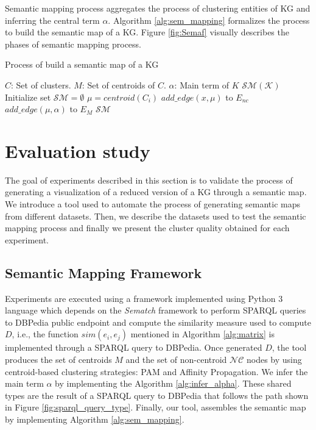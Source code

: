 \documentclass{ieeeaccess}
\begin{document}
Semantic mapping process aggregates the process of clustering
entities of KG and inferring the central term $\alpha$.
Algorithm \ref{alg:sem_mapping} formalizes the process to
build the semantic map of a KG.  Figure \ref{fig:Semaf} 
visually describes the phases of semantic mapping process.

\begin{algorithm}
\caption{Process of build a semantic map of a KG}
\label{alg:sem_mapping}
\begin{algorithmic}[1]
\renewcommand{\algorithmicrequire}{\textbf{Input:}}
\renewcommand{\algorithmicensure}{\textbf{Output:}}
\REQUIRE $C$: Set of clusters.
\REQUIRE $M$: Set of centroids of $C$.
\REQUIRE $\alpha$: Main term of $K$
\ENSURE $\mathcal{SM(K)}$
\STATE Initialize set $\mathcal{SM} = \emptyset$
    \STATE $\mu = centroid(C_{i})$
        \STATE $add\_edge(x, \mu)$ to $E_{nc}$
    \ENDFOR
\ENDFOR
{}
    \STATE $add\_edge(\mu, \alpha)$ to $E_{M}$
\ENDFOR
\RETURN $\mathcal{SM}$
\end{algorithmic} 
\end{algorithm}

\section{Evaluation study}
\label{sec:results}

The goal of experiments described in this section is to validate the 
process of generating a visualization of a reduced version of a KG 
through a semantic map. We introduce a tool used to automate the 
process of generating semantic maps from different datasets. Then, 
we describe the datasets used to test the semantic mapping process and 
finally we present the cluster quality obtained for each experiment.

\subsection{Semantic Mapping Framework}

Experiments are executed using a framework implemented using 
Python 3 language which depends on the \textit{Sematch} 
framework \cite{ZHU201730} to perform SPARQL queries to 
DBPedia public endpoint and compute the similarity measure
used to compute $D$, i.e., the function $sim(e_{i}, e_{j})$
mentioned in Algorithm \ref{alg:matrix} is implemented through
a SPARQL query to DBPedia. Once generated $D$, the tool 
produces the set of centroids $M$ and the set of non-centroid
$\mathcal{NC}$ nodes by using centroid-based clustering
strategies: PAM and Affinity Propagation. We infer
the main term $\alpha$ by implementing the Algorithm
\ref{alg:infer_alpha}. These shared types are the
result of a SPARQL query to DBPedia that follows 
the path shown in Figure \ref{fig:sparql_query_type}. 
Finally, our tool, assembles the semantic map by 
implementing Algorithm \ref{alg:sem_mapping}.
\end{document}
